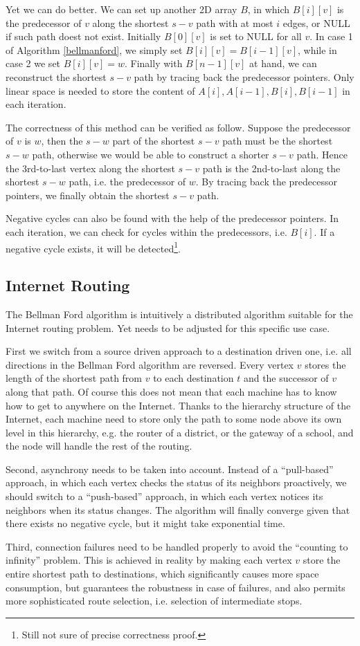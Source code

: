 Yet we can do better. We can set up another 2D array $B$, in which $B[i][v]$ is the predecessor of $v$ along the shortest $s-v$ path with at most $i$ edges, or NULL if such path doest not exist. Initially $B[0][v]$ is set to NULL for all $v$. In case 1 of Algorithm \ref{bellmanford}, we simply set $B[i][v]=B[i-1][v]$, while in case 2 we set $B[i][v]=w$. Finally with $B[n-1][v]$ at hand, we can reconstruct the shortest $s-v$ path by tracing back the predecessor pointers. Only linear space is needed to store the content of $A[i],A[i-1],B[i],B[i-1]$ in each iteration.

The correctness of this method can be verified as follow. Suppose the predecessor of $v$ is $w$, then the $s-w$ part of the shortest $s-v$ path must be the shortest $s-w$ path, otherwise we would be able to construct a shorter $s-v$ path. Hence the 3rd-to-last vertex along the shortest $s-v$ path is the 2nd-to-last along the shortest $s-w$ path, i.e. the predecessor of $w$. By tracing back the predecessor pointers, we finally obtain the shortest $s-v$ path.

Negative cycles can also be found with the help of the predecessor pointers. In each iteration, we can check for cycles within the predecessors, i.e. $B[i]$. If a negative cycle exists, it will be detected\footnote{Still not sure of precise correctness proof.}. 
\subsection{Internet Routing}
The Bellman Ford algorithm is intuitively a distributed algorithm suitable for the Internet routing problem. Yet needs to be adjusted for this specific use case. 

First we switch from a source driven approach to a destination driven one, i.e. all directions in the Bellman Ford algorithm are reversed. Every vertex $v$ stores the length of the shortest path from $v$ to each destination $t$ and the successor of $v$ along that path. Of course this does not mean that each machine has to know how to get to anywhere on the Internet. Thanks to the hierarchy structure of the Internet, each machine need to store only the path to some node above its own level in this hierarchy, e.g. the router of a district, or the gateway of a school, and the node will handle the rest of the routing. 

Second, asynchrony needs to be taken into account. Instead of a ``pull-based'' approach, in which each vertex checks the status of its neighbors proactively, we should switch to a ``push-based'' approach, in which each vertex notices its neighbors when its status changes. The algorithm will finally converge given that there exists no negative cycle, but it might take exponential time.

Third, connection failures need to be handled properly to avoid the ``counting to infinity'' problem. This is achieved in reality by making each vertex $v$ store the entire shortest path to destinations, which significantly causes more space consumption, but guarantees the robustness in case of failures, and also permits more sophisticated route selection, i.e. selection of intermediate stops.
\ifx\PREAMBLE\undefined

\fi